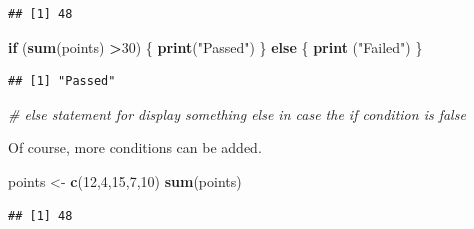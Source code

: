 \documentclass[]{report}
\newenvironment{Shaded}{\begin{snugshade}}{\end{snugshade}}
\newcommand{\KeywordTok}[1]{\textcolor[rgb]{0.13,0.29,0.53}{\textbf{#1}}}
\newcommand{\DecValTok}[1]{\textcolor[rgb]{0.00,0.00,0.81}{#1}}
\newcommand{\StringTok}[1]{\textcolor[rgb]{0.31,0.60,0.02}{#1}}
\newcommand{\CommentTok}[1]{\textcolor[rgb]{0.56,0.35,0.01}{\textit{#1}}}
\newcommand{\ControlFlowTok}[1]{\textcolor[rgb]{0.13,0.29,0.53}{\textbf{#1}}}
\newcommand{\OperatorTok}[1]{\textcolor[rgb]{0.81,0.36,0.00}{\textbf{#1}}}
\newcommand{\NormalTok}[1]{#1}
\begin{document}
\begin{verbatim}
## [1] 48
\end{verbatim}

\begin{Shaded}
\begin{Highlighting}[]
\ControlFlowTok{if}\NormalTok{ (}\KeywordTok{sum}\NormalTok{(points) }\OperatorTok{>}\DecValTok{30}\NormalTok{) \{}
  \KeywordTok{print}\NormalTok{(}\StringTok{"Passed"}\NormalTok{)}
\NormalTok{\} }\ControlFlowTok{else}\NormalTok{  \{}
  \KeywordTok{print}\NormalTok{ (}\StringTok{"Failed"}\NormalTok{)}
\NormalTok{\}}
\end{Highlighting}
\end{Shaded}

\begin{verbatim}
## [1] "Passed"
\end{verbatim}

\begin{Shaded}
\begin{Highlighting}[]
\CommentTok{# else statement for display something else in case the if condition is false}
\end{Highlighting}
\end{Shaded}

Of course, more conditions can be added.

\begin{Shaded}
\begin{Highlighting}[]
\NormalTok{points <-}\StringTok{ }\KeywordTok{c}\NormalTok{(}\DecValTok{12}\NormalTok{,}\DecValTok{4}\NormalTok{,}\DecValTok{15}\NormalTok{,}\DecValTok{7}\NormalTok{,}\DecValTok{10}\NormalTok{)}
\KeywordTok{sum}\NormalTok{(points)}
\end{Highlighting}
\end{Shaded}

\begin{verbatim}
## [1] 48
\end{verbatim}
\end{document}
